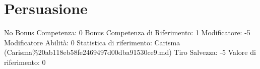 \section{Persuasione}\label{persuasione}

\begin{description}
\tightlist
\item[Tags: ABI]
No Bonus Competenza: 0 Bonus Competenza di Riferimento: 1 Modificatore:
-5 Modificatore Abilità: 0 Statistica di riferimento: Carisma
(Carisma\%20ab118eb58fe2469497d00dba91530ce9.md) Tiro Salvezza: -5
Valore di riferimento: 0
\end{description}
